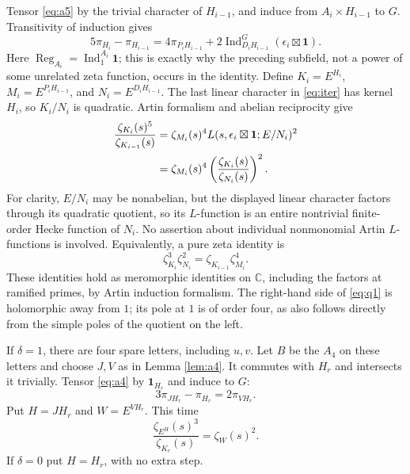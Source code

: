 \documentclass[11pt]{article}
\theoremstyle{remark}\newtheorem{remark}[theorem]{Remark}
\newcommand{\Ind}{\operatorname{Ind}}
\newcommand{\Reg}{\operatorname{Reg}}
\newcommand{\one}{\mathbf{1}}
\newcommand{\C}{\mathbb C}
\begin{document}
Tensor \eqref{eq:a5} by the trivial character of $H_{i-1}$, and induce from
$A_i\times H_{i-1}$ to $G$. Transitivity of induction gives
\begin{equation}\label{eq:iter}
5\pi_{H_i}-\pi_{H_{i-1}}=4\pi_{P_iH_{i-1}}+
 2\Ind_{D_iH_{i-1}}^G(\epsilon_i\boxtimes\one).
\end{equation}
Here $\Reg_{A_i}=\Ind_{1}^{A_i}\one$; this is exactly why the preceding
subfield, not a power of some unrelated zeta function, occurs in the identity.
Define $K_i=E^{H_i}$, $M_i=E^{P_iH_{i-1}}$, and $N_i=E^{D_iH_{i-1}}$.
The last linear character in \eqref{eq:iter} has kernel $H_i$, so $K_i/N_i$
is quadratic. Artin formalism and abelian reciprocity \cite{fgm} give
\begin{align}
 \frac{\zeta_{K_i}(s)^5}{\zeta_{K_{i-1}}(s)}
 &=\zeta_{M_i}(s)^4 L(s,\epsilon_i\boxtimes\one;E/N_i)^2\label{eq:q1}\\
 &=\zeta_{M_i}(s)^4\left(\frac{\zeta_{K_i}(s)}{\zeta_{N_i}(s)}\right)^2.\notag
\end{align}
For clarity, $E/N_i$ may be nonabelian, but the displayed linear character
factors through its quadratic quotient, so its $L$-function is an entire
nontrivial finite-order Hecke function of $N_i$. No assertion about individual
nonmonomial Artin $L$-functions is involved. Equivalently, a pure zeta identity is
\begin{equation}\label{eq:purezeta}
 \zeta_{K_i}^3\zeta_{N_i}^2=\zeta_{K_{i-1}}\zeta_{M_i}^4.
\end{equation}
These identities hold as meromorphic identities on $\C$, including the factors
at ramified primes, by Artin induction formalism. The right-hand side of
\eqref{eq:q1} is holomorphic away from $1$; its pole at $1$ is of order four,
as also follows directly from the simple poles of the quotient on the left.

If $\delta=1$, there are four spare letters, including $u,v$. Let $B$ be the
$A_4$ on these letters and choose $J,V$ as in Lemma \ref{lem:a4}. It commutes
with $H_r$ and intersects it trivially. Tensor \eqref{eq:a4} by $\one_{H_r}$
and induce to $G$:
\[
 3\pi_{JH_r}-\pi_{H_r}=2\pi_{VH_r}.
\]
Put $H=JH_r$ and $W=E^{VH_r}$. This time
\begin{equation}\label{eq:extra}
 \frac{\zeta_{E^H}(s)^3}{\zeta_{K_r}(s)}=\zeta_W(s)^2.
\end{equation}
If $\delta=0$ put $H=H_r$, with no extra step.
\end{document}
